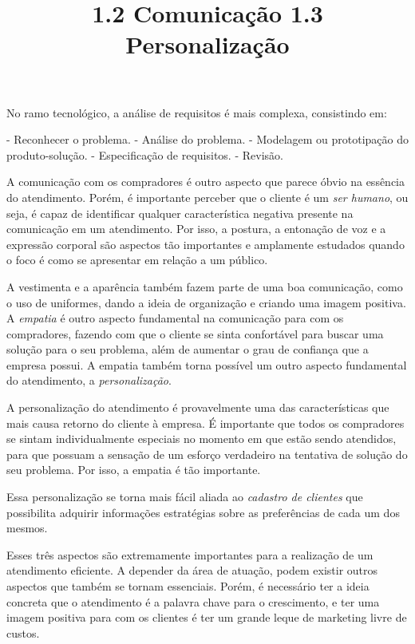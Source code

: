 \documentclass[12pt]{article}
\begin{document}
No ramo tecnológico, a análise de requisitos é mais complexa, consistindo em: \hfill \break

- Reconhecer o problema. \hfill \break
- Análise do problema. \hfill \break
- Modelagem ou prototipação do produto-solução. \hfill \break
- Especificação de requisitos. \hfill \break
- Revisão. \hfill \break

\title{%
\large 1.2 Comunicação}
\hfill \break

A comunicação com os compradores é outro aspecto que parece óbvio na essência do atendimento. Porém, é importante perceber que o cliente é um \emph{ser humano}, ou seja, é capaz de identificar qualquer característica negativa presente na comunicação em um atendimento. Por isso, a postura, a entonação de voz e a expressão corporal são aspectos tão importantes e amplamente estudados quando o foco é como se apresentar em relação a um público. \hfill \break

A vestimenta e a aparência também fazem parte de uma boa comunicação, como o uso de uniformes, dando a ideia de organização e criando uma imagem positiva. A \emph{empatia} é outro aspecto fundamental na comunicação para com os compradores, fazendo com que o cliente se sinta confortável para buscar uma solução para o seu problema, além de aumentar o grau de confiança que a empresa possui. A empatia também torna possível um outro aspecto fundamental do atendimento, a \emph{personalização}.\hfill \break

\title{%
\large 1.3 Personalização}
\hfill \break

A personalização do atendimento é provavelmente uma das características que mais causa retorno do cliente à empresa. É importante que todos os compradores se sintam individualmente especiais no momento em que estão sendo atendidos, para que possuam a sensação de um esforço verdadeiro na tentativa de solução do seu problema. Por isso, a empatia é tão importante.\hfill \break

Essa personalização se torna mais fácil aliada ao \emph{cadastro de clientes} que possibilita adquirir informações estratégias sobre as preferências de cada um dos mesmos.\hfill \break
\hfill \break
\hfill \break

Esses três aspectos são extremamente importantes para a realização de um atendimento eficiente. A depender da área de atuação, podem existir outros aspectos que também se tornam essenciais. Porém, é necessário ter a ideia concreta que o atendimento é a palavra chave para o crescimento, e ter uma imagem positiva para com os clientes é ter um grande leque de marketing livre de custos.
\end{document}
